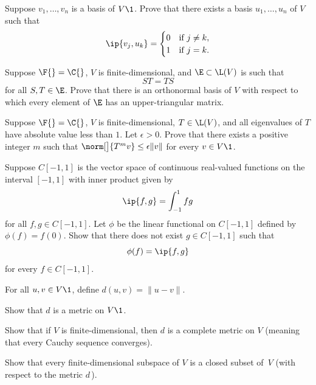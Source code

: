 \exercise
Suppose $v_1, \ldots, v_n$ is a basis of $V\1$. Prove that there exists a basis $u_1, \ldots, u_n$ of $V$ such that
\[
\ip{v_j, u_k} = \begin{cases}
0 & \text{if } j \ne k, \\
1 & \text{if } j=k.
\end{cases}
\]
\vspace{-.19in}


\exercise
Suppose $\F{}=\C{}$, $V$ is finite-dimensional, and $\E \subset \L(V)$ is such that \[ST = TS\] for all $S, T \in \E$. Prove that there is an orthonormal basis of $V$ with respect to which every element of $\E$ has an upper-triangular matrix.%
 \label{3Schur}


\exercise
Suppose $\F{} = \C{}$, $V$ is finite-dimensional, $T \in \L(V)$, and all eigenvalues of $T$ have absolute value less than $1$. Let $\epsilon > 0$. Prove that there exists a positive integer $m$ such that
$\norm[\big]{T^m v} \le \epsilon \|v\|$ for every $v \in V\1$.


\exercise
Suppose $C[-1, 1]$ is the vector space of continuous real-valued functions on the interval $[-1 ,1]$ with inner product given by 
\[
\ip{f, g} = \int_{-1}^1 fg
\]
for all $f, g \in C[-1, 1]$. Let $\phi$ be the linear functional on $C[-1, 1]$ defined by $\phi(f) = f(0)$. Show that there does not exist $g \in C[-1, 1]$ such that
\[
\phi(f) = \ip{f, g}
\]
for every $f \in C[-1, 1]$.


\exercise
For all $u, v \in V\1$, define $d(u, v) = \|u - v\|$.\label{4metric}
\begin{subtheorem}
\item
Show that $d$ is a metric on $V\1$.
\item
Show that if $V$ is finite-dimensional, then $d$ is a complete metric on $V$ (meaning that every Cauchy sequence converges).
\item
Show that every finite-dimensional subspace of $V$ is a closed subset of~$V$ (with respect to the metric $d$\,).
\end{subtheorem}


